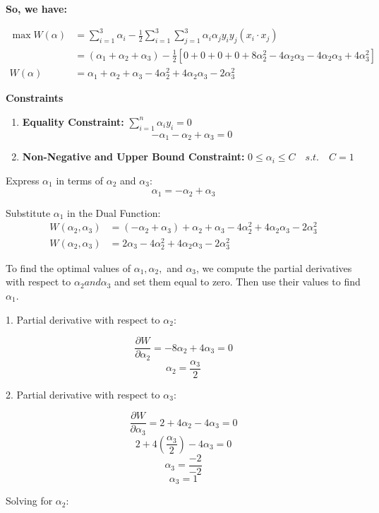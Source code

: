 \documentclass[11pt]{article}
\begin{document}
\begin{enumerate}
\textbf{So, we have:}

\[
\begin{aligned}
\max W(\alpha) &=\sum^3_{i=1} \alpha_i - \frac{1}{2}\sum^3_{i=1}\sum^3_{j=1}\alpha_i\alpha_j y_i y_j ({x_i \cdot x_j}) \\[5pt]
&=(\alpha_1 + \alpha_2 + \alpha_3) - \frac{1}{2} [0+0+0+0+8\alpha_2^2 - 4\alpha_2\alpha_3 - 4\alpha_2\alpha_3 + 4\alpha_3^2] \\[5pt]
W(\alpha) &=\alpha_1 + \alpha_2 + \alpha_3 - 4\alpha_2^2 + 4\alpha_2\alpha_3 - 2\alpha_3^2
\end{aligned}
\]

\textbf{Constraints}

\begin{enumerate}
    \item \textbf{Equality Constraint:} $\sum^n_{i=1} \alpha_i y_i = 0$
    \[-\alpha_1 - \alpha_2 + \alpha_3 = 0\]
    \item \textbf{Non-Negative and Upper Bound Constraint:} $0 \leq \alpha_i \leq C \quad s.t. \quad C=1$
\end{enumerate}

Express $\alpha_1$ in terms of $\alpha_2$ and $\alpha_3$: 
\[\alpha_1 = -\alpha_2 +\alpha_3\]

Substitute $\alpha_1$ in the Dual Function:
\[
\begin{aligned}
    W(\alpha_2, \alpha_3) &=(-\alpha_2+\alpha_3)+\alpha_2+\alpha_3 - 4\alpha_2^2 + 4\alpha_2\alpha_3 - 2\alpha_3^2 \\[5pt]
    W(\alpha_2, \alpha_3) &=2\alpha_3 - 4\alpha_2^2 + 4\alpha_2\alpha_3 - 2\alpha_3^2 
\end{aligned}
\]

To find the optimal values of \( \alpha_1, \alpha_2, \) and \( \alpha_3 \), we compute the partial derivatives with respect to \(\alpha_2 and \alpha_3\) and set them equal to zero. Then use their values to find \(\alpha_1\).

1. Partial derivative with respect to \( \alpha_2 \):

\[
\frac{\partial W}{\partial \alpha_2} = - 8\alpha_2 + 4\alpha_3 = 0  
\]
\[
\alpha_2 = \frac{\alpha_3}{2}
\]

2. Partial derivative with respect to \( \alpha_3 \):

\[
\frac{\partial W}{\partial \alpha_3} = 2 + 4\alpha_2 - 4\alpha_3 = 0
\]
\[
2 + 4(\frac{\alpha_3}{2}) - 4\alpha_3 = 0
\]
\[
\alpha_3 = \frac{-2}{-2}
\]
\[
\alpha_3 = 1
\]

Solving for \(\alpha_2\):


\end{enumerate}
\end{document}
